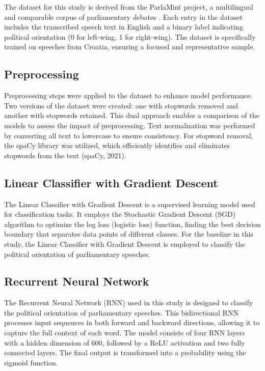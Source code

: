 \documentclass[10pt, a4paper]{article}
\begin{document}
The dataset for this study is derived from the ParlaMint project, a multilingual and comparable corpus of parliamentary debates \citep{parlamint-2021}. Each entry in the dataset includes the transcribed speech text in English and a binary label indicating political orientation (0 for left-wing, 1 for right-wing). The dataset is specifically trained on speeches from Croatia, ensuring a focused and representative sample.

\subsection{Preprocessing}
Preprocessing steps were applied to the dataset to enhance model performance. Two versions of the dataset were created: one with stopwords removed and another with stopwords retained. This dual approach enables a comparison of the models to assess the impact of preprocessing.
Text normalization was performed by converting all text to lowercase to ensure consistency. For stopword removal, the spaCy library was utilized, which efficiently identifies and eliminates stopwords from the text (spaCy, 2021).

\subsection{Linear Classifier with Gradient Descent} 

The Linear Classifier with Gradient Descent is a supervised learning model used for classification tasks. It employs the Stochastic Gradient Descent (SGD) algorithm to optimize the log loss (logistic loss) function, finding the best decision boundary that separates data points of different classes. For the baseline in this study, the Linear Classifier with Gradient Descent is employed to classify the political orientation of parliamentary speeches.

\subsection{Recurrent Neural Network} 

The Recurrent Neural Network (RNN) used in this study is designed to classify the political orientation of parliamentary speeches. This bidirectional RNN processes input sequences in both forward and backward directions, allowing it to capture the full context of each word. The model consists of four RNN layers with a hidden dimension of 600, followed by a ReLU activation and two fully connected layers. The final output is transformed into a probability using the sigmoid function.
\end{document}
